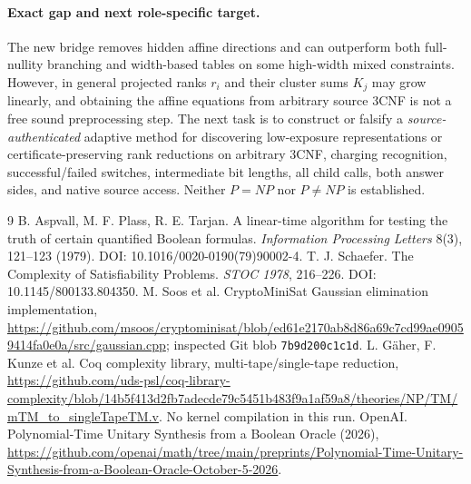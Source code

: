 \documentclass[11pt]{article}
\begin{document}
\paragraph{Exact gap and next role-specific target.} The new bridge removes hidden affine directions and can outperform both full-nullity branching and width-based tables on some high-width mixed constraints. However, in general projected ranks $r_i$ and their cluster sums $K_j$ may grow linearly, and obtaining the affine equations from arbitrary source 3CNF is not a free sound preprocessing step. The next task is to construct or falsify a \emph{source-authenticated} adaptive method for discovering low-exposure representations or certificate-preserving rank reductions on arbitrary 3CNF, charging recognition, successful/failed switches, intermediate bit lengths, all child calls, both answer sides, and native source access. Neither $P=NP$ nor $P\ne NP$ is established.
\begin{thebibliography}{9}
 B. Aspvall, M. F. Plass, R. E. Tarjan. A linear-time algorithm for testing the truth of certain quantified Boolean formulas. \emph{Information Processing Letters} 8(3), 121--123 (1979). DOI: 10.1016/0020-0190(79)90002-4.
 T. J. Schaefer. The Complexity of Satisfiability Problems. \emph{STOC 1978}, 216--226. DOI: 10.1145/800133.804350.
 M. Soos et al. CryptoMiniSat Gaussian elimination implementation, \url{https://github.com/msoos/cryptominisat/blob/ed61e2170ab8d86a69c7cd99ae09059414fa0e0a/src/gaussian.cpp}; inspected Git blob \texttt{7b9d200c1c1d}.
 L. G\"aher, F. Kunze et al. Coq complexity library, multi-tape/single-tape reduction, \url{https://github.com/uds-psl/coq-library-complexity/blob/14b5f413d2fb7adecde79c5451b483f9a1af59a8/theories/NP/TM/mTM_to_singleTapeTM.v}. No kernel compilation in this run.
 OpenAI. Polynomial-Time Unitary Synthesis from a Boolean Oracle (2026), \url{https://github.com/openai/math/tree/main/preprints/Polynomial-Time-Unitary-Synthesis-from-a-Boolean-Oracle-October-5-2026}.
\end{thebibliography}
\end{document}

